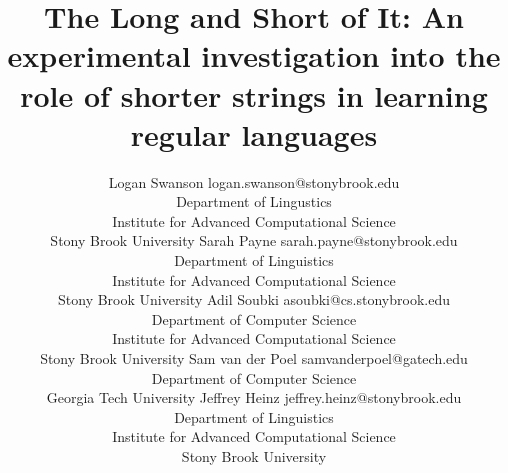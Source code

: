 \documentclass[twoside,11pt]{article}
\newcommand{\papertitle}{The Long and Short of It: An experimental investigation into the role of shorter strings in learning regular languages}
\begin{document}
\title{\papertitle}

 \author{
     \name Logan Swanson
     \email logan.swanson@stonybrook.edu\\
     \addr Department of Lingustics \\
     Institute for Advanced Computational Science \\
     Stony Brook University
     \AND
     \name Sarah Payne
     \email sarah.payne@stonybrook.edu\\
     \addr Department of Linguistics \\
     Institute for Advanced Computational Science \\
     Stony Brook University
     \AND
     \name Adil Soubki
     \email asoubki@cs.stonybrook.edu\\
     \addr Department of Computer Science \\
     Institute for Advanced Computational Science \\
     Stony Brook University
     \AND
     \name Sam van der Poel
     \email samvanderpoel@gatech.edu\\
     \addr Department of Computer Science \\
     Georgia Tech University
     \AND
     \name Jeffrey Heinz
     \email jeffrey.heinz@stonybrook.edu\\
     \addr Department of Linguistics \\
     Institute for Advanced Computational Science \\
     Stony Brook University
 }

\editor{}

\maketitle
\end{document}
